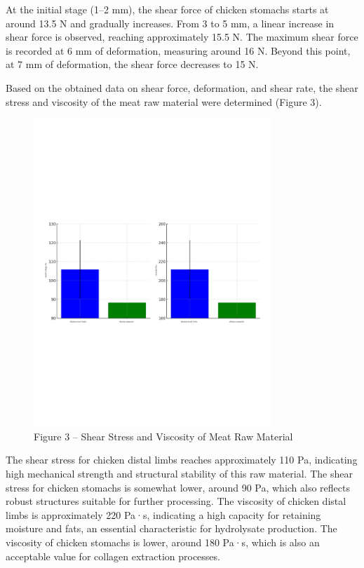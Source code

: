 At the initial stage (1--2 mm), the shear force of chicken stomachs
starts at around 13.5 N and gradually increases. From 3 to 5 mm, a
linear increase in shear force is observed, reaching approximately 15.5
N. The maximum shear force is recorded at 6 mm of deformation, measuring
around 16 N. Beyond this point, at 7 mm of deformation, the shear force
decreases to 15 N.

Based on the obtained data on shear force, deformation, and shear rate,
the shear stress and viscosity of the meat raw material were determined
(Figure 3).

\begin{figure}[H]
	\centering
	\includegraphics[width=0.8\textwidth]{media/pish/image11}
	\caption*{Figure 3 -- Shear Stress and Viscosity of Meat Raw Material}
\end{figure}



The shear stress for chicken distal limbs reaches approximately 110 Pa,
indicating high mechanical strength and structural stability of this raw
material. The shear stress for chicken stomachs is somewhat lower,
around 90 Pa, which also reflects robust structures suitable for further
processing. The viscosity of chicken distal limbs is approximately 220
Pa·s, indicating a high capacity for retaining moisture and fats, an
essential characteristic for hydrolysate production. The viscosity of
chicken stomachs is lower, around 180 Pa·s, which is also an acceptable
value for collagen extraction processes.

